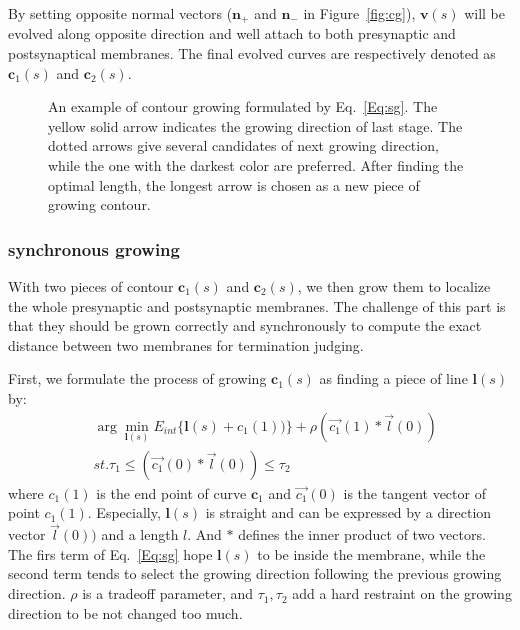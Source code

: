 By setting opposite normal vectors ($\mathbf{n}_{+}$ and $\mathbf{n}_{-}$ in Figure~\ref{fig:cg}), $\mathbf{v}(s)$ will be evolved along opposite direction and well attach to both presynaptic and postsynaptical membranes.
The final evolved curves are respectively denoted as $\mathbf{c}_1(s)$ and $\mathbf{c}_2(s)$.

\begin{figure}[t]
\begin{minipage}[b]{1.0\linewidth}
  \centering
 \centerline{}
\end{minipage}
\caption{An example of contour growing formulated by Eq.~\ref{Eq:sg}.
        The yellow solid arrow indicates the growing direction of last stage.
        The dotted arrows give several candidates of next growing direction, while the one with the darkest color are preferred.
        After finding the optimal length, the longest arrow is chosen as a new piece of growing contour.}
\label{fig:g}
\end{figure}

\subsubsection{synchronous growing}
With two pieces of contour $\mathbf{c}_1(s)$ and $\mathbf{c}_2(s)$, we then grow them to localize the whole presynaptic and postsynaptic membranes.
The challenge of this part is that they should be grown correctly and synchronously to compute the exact distance between two membranes for termination judging.

First, we formulate the process of growing $\mathbf{c}_1(s)$ as finding a piece of line $\mathbf{l}(s)$ by:
\begin{eqnarray}\label{Eq:sg}
&\arg\min_{\mathbf{l}(s)} E_{int}\{\mathbf{l}(s)+c_1(1))\}+\rho(\overrightarrow{c_1}(1)*\overrightarrow{l}(0))\\
&st. \tau_1\leq (\overrightarrow{c_1}(0)*\overrightarrow{l}(0))\leq \tau_2\nonumber
\end{eqnarray}
where $c_1(1)$ is the end point of curve $\mathbf{c}_1$ and $\overrightarrow{c_1}(0)$ is the tangent vector of point $c_1(1)$.
Especially, $\mathbf{l}(s)$ is straight and can be expressed by a direction vector $\overrightarrow{l}(0))$ and a length $l$.
And $*$ defines the inner product of two vectors.
The firs term of Eq.~\ref{Eq:sg} hope $\mathbf{l}(s)$ to be inside the membrane, while the second term tends to select the growing direction following the previous growing direction.
$\rho$ is a tradeoff parameter, and $\tau_1,\tau_2$ add a hard restraint on the growing direction to be not changed too much.


